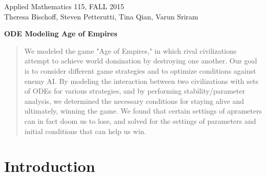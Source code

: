 \documentclass[12pt]{article}
\begin{document}
\begin{center}
Applied Mathematics 115, FALL 2015 \\


Theresa Bischoff, Steven Petterutti, Tina Qian, Varun Sriram

\medskip

\textbf{ODE Modeling Age of Empires}


\end{center}

\begin{abstract}
	We modeled the game "Age of Empires," in which rival civilizations attempt to achieve world domination by destroying one another. Our goal is to consider different game strategies and to optimize conditions against enemy AI. By modeling the interaction between two civilizations with sets of ODEs for various strategies, and by performing stability/parameter analysis, we determined the necessary conditions for staying alive and ultimately, winning the game. We found that certain settings of aprameters can in fact doom us to lose, and solved for the settings of parameters and initial conditions that can help us win.
	
\end{abstract}

\section{Introduction}
\end{document}
